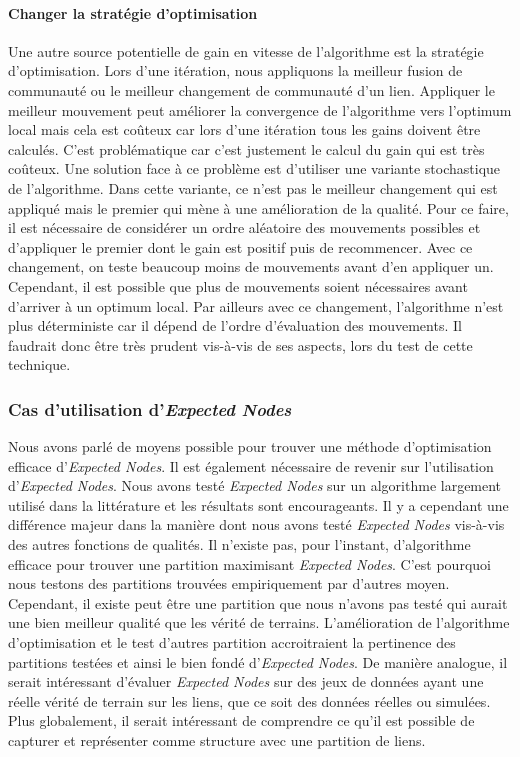 \paragraph{Changer la stratégie d'optimisation}
Une autre source potentielle de gain en vitesse de l'algorithme est la stratégie d'optimisation.
Lors d'une itération, nous appliquons la meilleur fusion de communauté ou le meilleur changement de communauté d'un lien.
Appliquer le meilleur mouvement peut améliorer la convergence de l'algorithme vers l'optimum local mais cela est coûteux car lors d'une itération tous les gains doivent être calculés.
C'est problématique car c'est justement le calcul du gain qui est très coûteux.
Une solution face à ce problème est d'utiliser une variante stochastique de l'algorithme.
Dans cette variante, ce n'est pas le meilleur changement qui est appliqué mais le premier qui mène à une amélioration de la qualité.
Pour ce faire, il est nécessaire de considérer un ordre aléatoire des mouvements possibles et d'appliquer le premier dont le gain est positif puis de recommencer.
Avec ce changement, on teste beaucoup moins de mouvements avant d'en appliquer un.
Cependant, il est possible que plus de mouvements soient nécessaires avant d'arriver à un optimum local.
Par ailleurs avec ce changement, l'algorithme n'est plus déterministe car il dépend de l'ordre d'évaluation des mouvements.
Il faudrait donc être très prudent vis-à-vis de ses aspects, lors du test de cette technique.

\subsubsection{Cas d'utilisation d'\emph{Expected Nodes}}
Nous avons parlé de moyens possible pour trouver une méthode d'optimisation efficace d'\emph{Expected Nodes}.
Il est également nécessaire de revenir sur l'utilisation d'\emph{Expected Nodes}.
Nous avons testé \emph{Expected Nodes} sur un algorithme largement utilisé dans la littérature et les résultats sont encourageants.
Il y a cependant une différence majeur dans la manière dont nous avons testé \emph{Expected Nodes} vis-à-vis des autres fonctions de qualités.
Il n'existe pas, pour l'instant, d'algorithme efficace pour trouver une partition maximisant \emph{Expected Nodes}.
C'est pourquoi nous testons des partitions trouvées empiriquement par d'autres moyen.
Cependant, il existe peut être une partition que nous n'avons pas testé qui aurait une bien meilleur qualité que les vérité de terrains.
L'amélioration de l'algorithme d'optimisation et le test d'autres partition accroitraient la pertinence des partitions testées et ainsi le bien fondé d'\emph{Expected Nodes}.
De manière analogue, il serait intéressant d'évaluer \emph{Expected Nodes} sur des jeux de données ayant une réelle vérité de terrain sur les liens, que ce soit des données réelles ou simulées.
Plus globalement, il serait intéressant de comprendre ce qu'il est possible de capturer et représenter comme structure avec une partition de liens.

